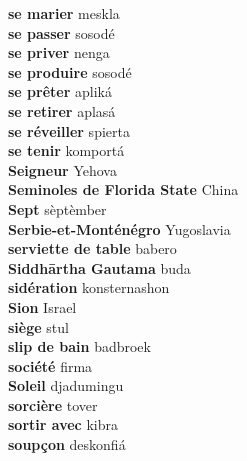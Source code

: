 \textbf{ se marier  } meskla \\
\textbf{ se passer  } sosodé \\
\textbf{ se priver  } nenga \\
\textbf{ se produire  } sosodé \\
\textbf{ se prêter  } apliká \\
\textbf{ se retirer  } aplasá \\
\textbf{ se réveiller  } spierta \\
\textbf{ se tenir  } komportá \\
\textbf{ Seigneur  } Yehova \\
\textbf{ Seminoles de Florida State  } China \\
\textbf{ Sept  } sèptèmber \\
\textbf{ Serbie-et-Monténégro  } Yugoslavia \\
\textbf{ serviette de table  } babero \\
\textbf{ Siddhārtha Gautama  } buda \\
\textbf{ sidération  } konsternashon \\
\textbf{ Sion  } Israel \\
\textbf{ siège  } stul \\
\textbf{ slip de bain  } badbroek \\
\textbf{ société  } firma \\
\textbf{ Soleil  } djadumingu \\
\textbf{ sorcière  } tover \\
\textbf{ sortir avec  } kibra \\
\textbf{ soupçon  } deskonfiá \\
